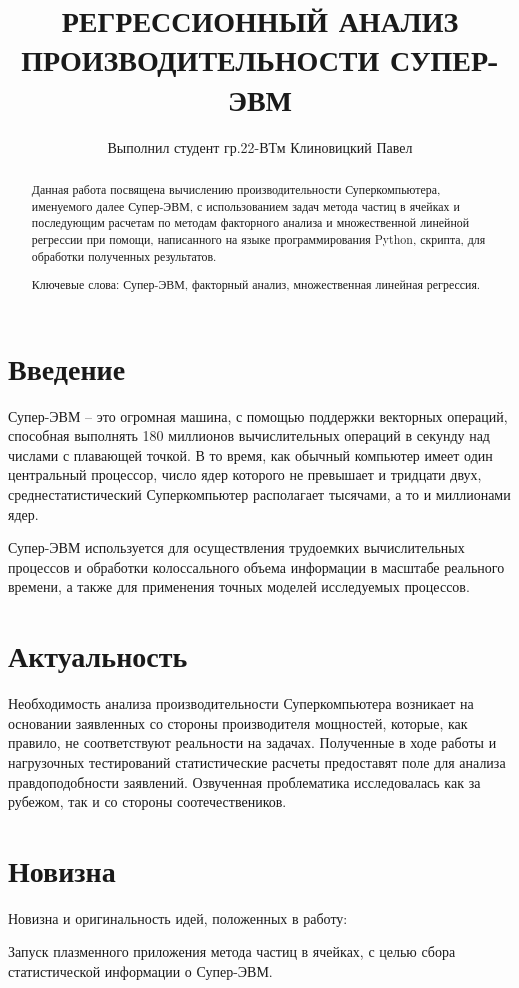 \documentclass{article}
\title{РЕГРЕССИОННЫЙ АНАЛИЗ ПРОИЗВОДИТЕЛЬНОСТИ СУПЕР-ЭВМ}
\author{Выполнил студент гр.22-ВТм Клиновицкий Павел}
\begin{document}
\maketitle

\begin{abstract}
Данная работа посвящена вычислению производительности Суперкомпьютера, именуемого далее Супер-ЭВМ, с использованием задач метода частиц в ячейках и последующим расчетам по методам факторного анализа и множественной линейной регрессии при помощи, написанного на языке программирования Python, скрипта, для обработки полученных результатов.

Ключевые слова: Супер-ЭВМ, факторный анализ, множественная линейная регрессия.
\end{abstract}

\section{Введение}
Супер-ЭВМ – это огромная машина, с помощью поддержки векторных операций, способная выполнять 180 миллионов вычислительных операций в секунду над числами с плавающей точкой. В то время, как обычный компьютер имеет один центральный процессор, число ядер которого не превышает и тридцати двух, среднестатистический Суперкомпьютер располагает тысячами, а то и миллионами ядер.

Супер-ЭВМ используется для осуществления трудоемких вычислительных процессов и обработки колоссального объема информации в масштабе реального времени, а также для применения точных моделей исследуемых процессов.

\section{Актуальность}
Необходимость анализа производительности Суперкомпьютера возникает на основании заявленных со стороны производителя мощностей, которые, как правило, не соответствуют реальности на задачах. Полученные в ходе работы и нагрузочных тестирований статистические расчеты предоставят поле для анализа правдоподобности заявлений.
Озвученная проблематика исследовалась как за рубежом, так и со стороны соотечествеников.

\section{Новизна}
Новизна и оригинальность идей, положенных в работу:

Запуск плазменного приложения метода частиц в ячейках, с целью сбора статистической информации о Супер-ЭВМ.
\end{document}

